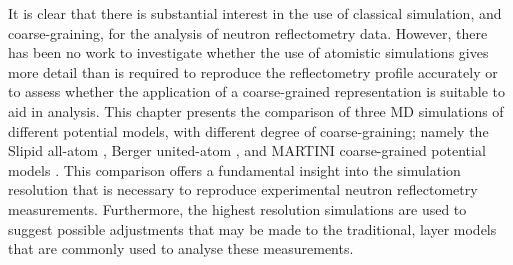 It is clear that there is substantial interest in the use of classical simulation, and coarse-graining, for the analysis of neutron reflectometry data.
However, there has been no work to investigate whether the use of atomistic simulations gives more detail than is required to reproduce the reflectometry profile accurately or to assess whether the application of a coarse-grained representation is suitable to aid in analysis.
This chapter presents the comparison of three MD simulations of different potential models, with different degree of coarse-graining; namely the Slipid all-atom \cite{jambeck_derivation_2012}, Berger united-atom \cite{berger_molecular_1997}, and MARTINI coarse-grained potential models \cite{marrink_martini_2007}.
This comparison offers a fundamental insight into the simulation resolution that is necessary to reproduce experimental neutron reflectometry measurements.
Furthermore, the highest resolution simulations are used to suggest possible adjustments that may be made to the traditional, layer models that are commonly used to analyse these measurements.
